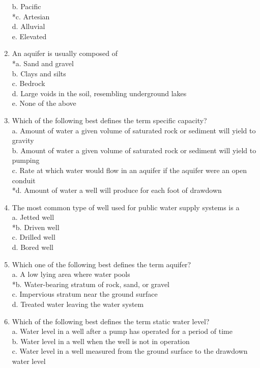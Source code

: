 \begin{enumerate}
b. Pacific\\
*c. Artesian\\
d. Alluvial\\
e. Elevated\\
\item An aquifer is usually composed of\\
*a. Sand and gravel\\
b. Clays and silts\\
c. Bedrock\\
d. Large voids in the soil, resembling underground lakes\\
e. None of the above\\
\item Which of the following best defines the term specific capacity?\\
a. Amount of water a given volume of saturated rock or sediment will yield to gravity\\
b. Amount of water a given volume of saturated rock or sediment will yield to pumping\\
c. Rate at which water would flow in an aquifer if the aquifer were an open conduit\\
*d. Amount of water a well will produce for each foot of drawdown\\
\item The most common type of well used for public water supply systems is a\\
a. Jetted well\\
*b. Driven well\\
c. Drilled well\\
d. Bored well
\item Which one of the following best defines the term aquifer?\\
a. A low lying area where water pools\\
*b. Water-bearing stratum of rock, sand, or gravel\\
c. Impervious stratum near the ground surface\\
d. Treated water leaving the water system\\
\item Which of the following best defines the term static water level?\\
a. Water level in a well after a pump has operated for a period of time\\
b. Water level in a well when the well is not in operation\\
c. Water level in a well measured from the ground surface to the drawdown water level\\

\end{enumerate}
